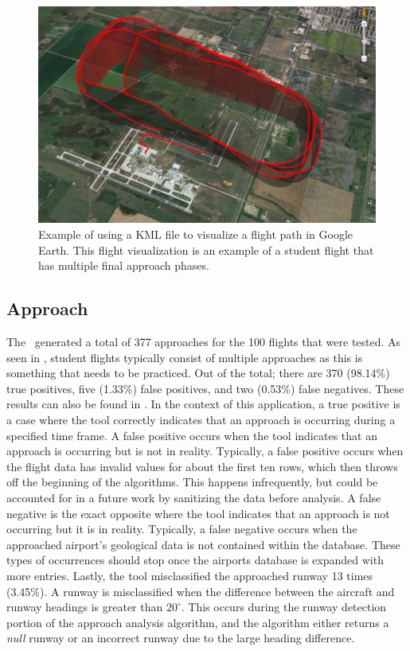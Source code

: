     \begin{figure}
    	\centering
        \includegraphics[width=\linewidth]{img/kml_example}
        \caption{Example of using a KML file to visualize a flight path in Google Earth.  This flight visualization is an example of a student flight that has multiple final approach phases.}
        \label{fig:kml_example}
    \end{figure}
    
    
    \subsection{Approach}
    
        The \toolname\ generated a total of 377 approaches for the 100 flights that were tested. As seen in , student flights typically consist of multiple approaches as this is something that needs to be practiced.  Out of the total; there are 370 (98.14\%) true positives, five (1.33\%) false positives, and two (0.53\%) false negatives.  These results can also be found in .  In the context of this application, a true positive is a case where the tool correctly indicates that an approach is occurring during a specified time frame.  A false positive occurs when the tool indicates that an approach is occurring but is not in reality.  Typically, a false positive occurs when the flight data has invalid values for about the first ten rows, which then throws off the beginning of the algorithms.  This happens infrequently, but could be accounted for in a future work by sanitizing the data before analysis.  A false negative is the exact opposite where the tool indicates that an approach is not occurring but it is in reality.  Typically, a false negative occurs when the approached airport's geological data is not contained within the database.  These types of occurrences should stop once the airports database is expanded with more entries.  Lastly, the tool misclassified the approached runway 13 times (3.45\%).  A runway is misclassified when the difference between the aircraft and runway headings is greater than $20^\circ$.  This occurs during the runway detection portion of the approach analysis algorithm, and the algorithm either returns a \emph{null} runway or an incorrect runway due to the large heading difference.

